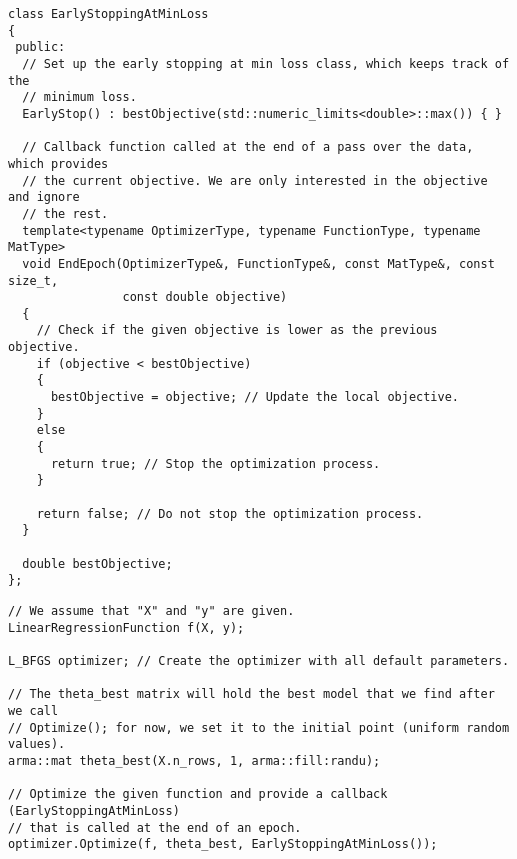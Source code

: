 \begin{verbatim}
class EarlyStoppingAtMinLoss
{
 public:
  // Set up the early stopping at min loss class, which keeps track of the
  // minimum loss.
  EarlyStop() : bestObjective(std::numeric_limits<double>::max()) { }

  // Callback function called at the end of a pass over the data, which provides
  // the current objective. We are only interested in the objective and ignore
  // the rest.
  template<typename OptimizerType, typename FunctionType, typename MatType>
  void EndEpoch(OptimizerType&, FunctionType&, const MatType&, const size_t,
                const double objective)
  {
    // Check if the given objective is lower as the previous objective.
    if (objective < bestObjective)
    {
      bestObjective = objective; // Update the local objective.
    }
    else
    {
      return true; // Stop the optimization process.
    }

    return false; // Do not stop the optimization process.
  }

  double bestObjective;
};
\end{verbatim}


\begin{verbatim}
// We assume that "X" and "y" are given.
LinearRegressionFunction f(X, y);

L_BFGS optimizer; // Create the optimizer with all default parameters.

// The theta_best matrix will hold the best model that we find after we call
// Optimize(); for now, we set it to the initial point (uniform random values).
arma::mat theta_best(X.n_rows, 1, arma::fill:randu);

// Optimize the given function and provide a callback (EarlyStoppingAtMinLoss)
// that is called at the end of an epoch.
optimizer.Optimize(f, theta_best, EarlyStoppingAtMinLoss());
\end{verbatim}
